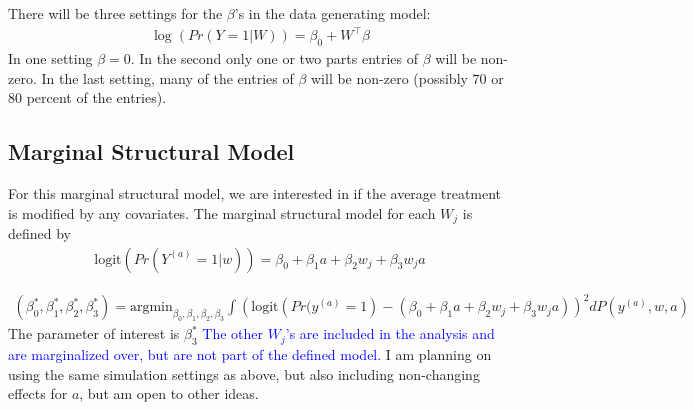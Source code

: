 \documentclass{article}
\newcommand{\sh}{\textcolor{red}}
\begin{document}
There will be three settings for the $\beta$'s in the data generating model:
\begin{align*}
    \log(Pr(Y = 1 | W)) = \beta_0 + W^\top \beta
\end{align*}
In one setting $\beta = 0$.  In the second only one or two parts entries of $\beta$ will be non-zero.  In the last setting, many of the entries of $\beta$ will be non-zero (possibly $70$ or $80$ percent of the entries). 

\subsection{Marginal Structural Model}
For this marginal structural model, we are interested in if the average treatment is modified by any covariates.  The marginal structural model for each $W_j$ is defined by
\begin{align*}
\text{logit}\left(Pr(Y^{(a)} = 1 | w)\right) = \beta_0 + \beta_1 a + \beta_2 w_j + \beta_3 w_j a
\end{align*}

\begin{align*}
(\beta_0^*, \beta_1^*, \beta_2^*, \beta_3^*) = \text{argmin}_{\beta_0, \beta_1, \beta_2, \beta_3}\int\left(\text{logit}\left(Pr(y^{(a)} = 1\right) - (\beta_0 + \beta_1 a + \beta_2w_j + \beta_3 w_j a) \right)^2 dP(y^{(a)}, w, a)
\end{align*}
The parameter of interest is $\beta_3^*$
\textcolor{blue}{The other $W_j$'s are included in the analysis and are marginalized over, but are not part of the defined model.} I am planning on using the same simulation settings as above, but also including non-changing effects for $a$, but am open to other ideas.
\end{document}
